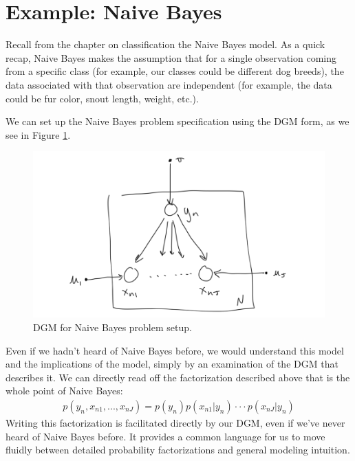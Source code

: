
\section{Example: Naive Bayes}
Recall from the chapter on classification the Naive Bayes model. As a quick recap, Naive Bayes makes the assumption that for a single observation coming from a specific class (for example, our classes could be different dog breeds), the data associated with that observation are independent (for example, the data could be fur color, snout length, weight, etc.).

We can set up the Naive Bayes problem specification using the DGM form, as we see in Figure \ref{fig:naive-bayes}.
\begin{figure}
	\centering
	\includegraphics[width=0.5\paperwidth]{../GraphicalModels/fig/naive-bayes-dgm.png}
    \caption{DGM for Naive Bayes problem setup.}
	\label{fig:naive-bayes}
\end{figure}

Even if we hadn't heard of Naive Bayes before, we would understand this model and the implications of the model, simply by an examination of the DGM that describes it. We can directly read off the factorization described above that is the whole point of Naive Bayes:
\begin{align*}
	p(y_n, x_{n1}, ..., x_{nJ}) = p(y_n) p(x_{n1} | y_n) \cdot \cdot \cdot p(x_{nJ} | y_n)
\end{align*}
Writing this factorization is facilitated directly by our DGM, even if we've never heard of Naive Bayes before. It provides a common language for us to move fluidly between detailed probability factorizations and general modeling intuition.

